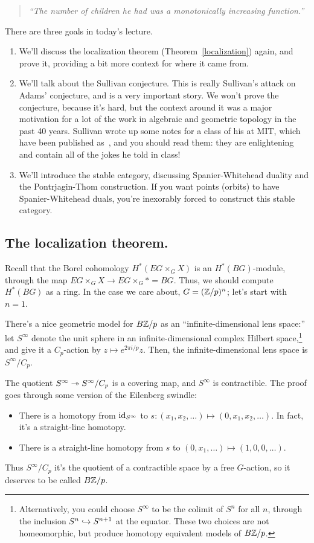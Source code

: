 \begin{quote}\textit{
	``The number of children he had was a monotonically increasing function.''
}\end{quote}
There are three goals in today's lecture.
\begin{enumerate}
	\item We'll discuss the localization theorem (Theorem~\ref{localization}) again, and prove it, providing a bit
	more context for where it came from.
	\item We'll talk about the Sullivan conjecture. This is really Sullivan's attack on Adams' conjecture, and is a
	very important story. We won't prove the conjecture, because it's hard, but the context around it was a major
	motivation for a lot of the work in algebraic and geometric topology in the past 40 years. Sullivan wrote up
	some notes for a class of his at MIT, which have been published as~\cite{MITNotes}, and you should read them:
	they are enlightening and contain all of the jokes he told in class!
	\item We'll introduce the stable category, discussing Spanier-Whitehead duality and the Pontrjagin-Thom
	construction. If you want points (orbits) to have Spanier-Whitehead duals, you're inexorably forced to
	construct this stable category.
\end{enumerate}
\subsection*{The localization theorem.}
Recall that the Borel cohomology $H^*(EG\times_G X)$ is an $H^*(BG)$-module, through the map $EG\times_G X\to
EG\times_G * = BG$. Thus, we should compute $H^*(BG)$ as a ring. In the case we care about, $G = (\mathbb Z/p)^n$; let's
start with $n = 1$.

There's a nice geometric model for $B\mathbb Z/p$ as an ``infinite-dimensional lens space:'' let $S^\infty$ denote the
unit sphere in an infinite-dimensional complex Hilbert space,\footnote{Alternatively, you could choose $S^\infty$
to be the colimit of $S^n$ for all $n$, through the inclusion $S^n\hookrightarrow S^{n+1}$ at the equator. These two choices
are not homeomorphic, but produce homotopy equivalent models of $B\mathbb Z/p$.} and give it a $C_p$-action by $z\mapsto
e^{2\pi i/p}z$. Then, the infinite-dimensional lens space is $S^\infty/C_p$.

The quotient $S^\infty\twoheadrightarrow S^\infty/C_p$ is a covering map, and $S^\infty$ is contractible. The proof goes through
some version of the Eilenberg swindle:
\begin{itemize}
	\item There is a homotopy from $\mathrm{id}_{S^\infty}$ to $s: (x_1,x_2,\dotsc)\mapsto (0, x_1, x_2, \dotsc)$. In fact,
	it's a straight-line homotopy.
	\item There is a straight-line homotopy from $s$ to $(0,x_1,\dotsc)\mapsto (1, 0, 0,\dotsc)$.
\end{itemize}
Thus $S^\infty/C_p$ it's the quotient of a contractible space by a free $G$-action, so it deserves to be called
$B\mathbb Z/p$.

